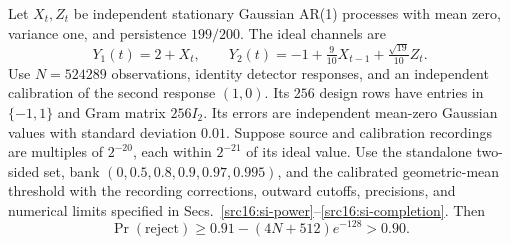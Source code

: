 \begin{theorem*}\label{src16:power-thm}
Let $X_t,Z_t$ be independent stationary Gaussian AR(1) processes with mean zero, variance one, and persistence $199/200$. The ideal channels are
\[
 Y_1(t)=2+X_t,\qquad
 Y_2(t)=-1+\tfrac9{10}X_{t-1}+\tfrac{\sqrt{19}}{10}Z_t.
\]
Use $N=524289$ observations, identity detector responses, and an independent calibration of the second response $(1,0)$. Its $256$ design rows have entries in $\{-1,1\}$ and Gram matrix $256I_2$. Its errors are independent mean-zero Gaussian values with standard deviation $0.01$. Suppose source and calibration recordings are multiples of $2^{-20}$, each within $2^{-21}$ of its ideal value. Use the standalone two-sided set, bank $(0,0.5,0.8,0.9,0.97,0.995)$, and the calibrated geometric-mean threshold with the recording corrections, outward cutoffs, precisions, and numerical limits specified in Secs.~\ref{src16:si-power}--\ref{src16:si-completion}. Then
\begin{equation}\label{src16:implemented-power}
 \Pr(\mathrm{reject})\ge0.91-(4N+512)e^{-128}>0.90.
\end{equation}
\end{theorem*}


